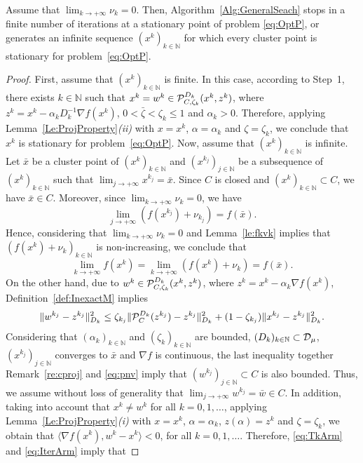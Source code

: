 \begin{proposition} \label{pr:statArm}
	Assume that $\lim_{k\to +\infty} \nu_{k} = 0$.   Then, Algorithm~\ref{Alg:GeneralSeach} stops in a finite number of iterations at a stationary point of problem \eqref{eq:OptP}, or generates an infinite sequence $(x^k)_{k\in\mathbb{N}}$ for which every cluster point is stationary for problem~\eqref{eq:OptP}.
\end{proposition}
\begin{proof}
	First, assume that $(x^k)_{k\in\mathbb{N}}$ is finite. In this case, according to Step~1,   there exists $k \in \mathbb{N}$ such that $x^k = w^k \in{\cal P}_{C, \zeta_k}^{D_k}(x^{k}, z^k)$, where $z^k = x^{k}-\alpha_k D_k^{-1}\nabla f(x^{k})$, $0 <{\bar \zeta}<\zeta_k \leq 1$ and $\alpha_k > 0$. Therefore, applying Lemma~\ref{Le:ProjProperty}{\it (ii)} with $x = x^{k}$, $\alpha = \alpha_k$ and $\zeta= \zeta_k$, we conclude that $x^k$ is stationary for problem~\eqref{eq:OptP}.  Now, assume that $(x^k)_{k\in\mathbb{N}}$ is infinite.   Let ${\bar x}$ be a cluster point of $(x^k)_{k\in\mathbb{N}}$ and $(x^{k_j})_{j\in\mathbb{N}}$ be a subsequence of $(x^k)_{k\in\mathbb{N}}$ such that $\lim_{j\to +\infty} x^{k_j} = \bar{x}$. Since $C$ is closed and  $(x^k)_{k\in\mathbb{N}}\subset C$,  we have $\bar{x} \in C$. Moreover,     since  $\lim_{k\to +\infty} \nu_{k} = 0$, we have 
	$$\lim_{j\to +\infty}\left(f(x^{k_j}) +\nu_{k_j}\right) =f(\bar{x}).$$ 
	Hence, considering that  $\lim_{k\to +\infty} \nu_{k} = 0$ and Lemma~\ref{le:fkvk} implies  that   $\left(f(x^k)+\nu_{k}\right)_{k\in\mathbb{N}}$  is  non-increasing, we conclude that 
	$$\lim_{k\to +\infty} f(x^{k})= \lim_{k\to +\infty}\left(f(x^{k}) +\nu_{k}\right) =f(\bar{x}).$$
	On the other hand,  due to  $w^k \in {\cal P}_{C, \zeta_k}^{D_k}(x^{k}, z^k)$, where $z^k = x^{k}-\alpha_k \nabla f(x^{k})$,  Definition~\ref{def:InexactM} implies
	\begin{equation} \label{eq:bsw}
		\|w^{k_j} - z^{k_j}\|_{D_k}^2\leq \zeta_{k_j} \| {\cal P}_{C}^{ D_k}(z^{k_j})-z^{k_j}\|_{D_k}^2+(1-\zeta_{k_j})\|x^{k_j}-z^{k_j}\|_{D_k}^2 .
	\end{equation}
	Considering that $(\alpha_k)_{k\in\mathbb{N}}$ and $(\zeta_k)_{k\in\mathbb{N}}$ are bounded, $(D_k)_{k\in\mathbb{N}}\subset  {\cal D}_{\mu}$,  $(x^{k_j})_{j\in\mathbb{N}}$ converges to ${\bar x}$ and $\nabla f$ is continuous, the last inequality together Remark~\ref{re:cproj} and \eqref{eq:pnv}  imply that $(w^{k_j})_{j\in\mathbb{N}}\subset C$ is also bounded. Thus, we assume without loss of generality that $\lim_{j\to +\infty} w^{k_j} = \bar{w}\in C$.  In addition,  taking into account that  $x^k \neq w^k$ for all $k = 0,1, \ldots$, applying Lemma~\ref{Le:ProjProperty}{\it (i)} with $x = x^{k}$, $\alpha = \alpha_k$, $z(\alpha)=z^k$ and $\zeta= \zeta_k$, we obtain  that $\langle \nabla f(x^k), w^k- x^k \rangle < 0$, for all $k = 0, 1, \ldots$. Therefore,  \eqref{eq:TkArm} and \eqref{eq:IterArm} imply that

\end{proof}
